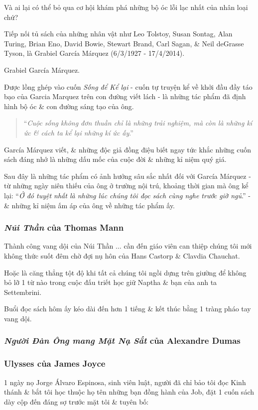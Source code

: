 \documentclass{article}
\begin{document}
Và ai lại có thể bỏ qua cơ hội khám phá những bộ óc lỗi lạc nhất của nhân loại chứ?

Tiếp nối tủ sách của những nhân vật như Leo Tolstoy, Susan Sontag, Alan Turing, Brian Eno, David Bowie, Stewart Brand, Carl Sagan, \& Neil deGrasse Tyson, là Grabiel García Márquez (6/3/1927 - 17/4/2014).

\textsf{Grabiel García Márquez.}

%
Được lồng ghép vào cuốn \textit{Sống để Kể lại} - cuốn tự truyện kể về khởi đầu đầy táo bạo của Garcia Marquez trên con đường viết lách - là những tác phẩm đã định hình bộ óc \& con đường sáng tạo của ông.

\begin{quotation}
	``\textit{Cuộc sống không đơn thuần chỉ là những trải nghiệm, mà còn là những kí ức \& cách ta kể lại những kí ức ấy}.''
\end{quotation}
García Márquez viết, \& những độc giả đồng điệu biết ngay tức khắc những cuốn sách đáng nhớ là những dấu mốc của cuộc đời \& những kỉ niệm quý giá.

%
Sau đây là những tác phẩm có ảnh hưởng sâu sắc nhất đối với García Márquez - từ những ngày niên thiếu của ông ở trường nội trú, khoảng thời gian mà ông kể lại: ``\textit{Ở đó tuyệt nhất là những lúc chúng tôi đọc sách cùng nghe trước giờ ngủ}.'' - \& những kỉ niệm ấm áp của ông về những tác phẩm ấy.

\subsubsection{\textit{Núi Thần} của Thomas Mann}
Thành công vang dội của Núi Thần $\ldots$ cần đến giáo viên can thiệp chúng tôi mới không thức suốt đêm chờ đợi nụ hôn của Hans Castorp \& Clavdia Chauchat.

Hoặc là căng thẳng tột độ khi tất cả chúng tôi ngồi dựng trên giường để không bỏ lỡ 1 từ nào trong cuộc đấu triết học giữ Naptha \& bạn của anh ta Settembrini.

Buổi đọc sách hôm ấy kéo dài đến hơn 1 tiếng \& kết thúc bằng 1 tràng pháo tay vang dội.

\subsubsection{\textit{Người Đàn Ông mang Mặt Nạ Sắt} của Alexandre Dumas}

\subsubsection{Ulysses của James Joyce}
1 ngày nọ Jorge Álvaro Espinosa, sinh viên luật, người đã chỉ bảo tôi đọc Kinh thánh \& bắt tôi học thuộc họ tên những bạn đồng hành của Job, đặt 1 cuốn sách dày cộp đến đáng sợ trước mặt tôi \& tuyên bố:
\end{document}
